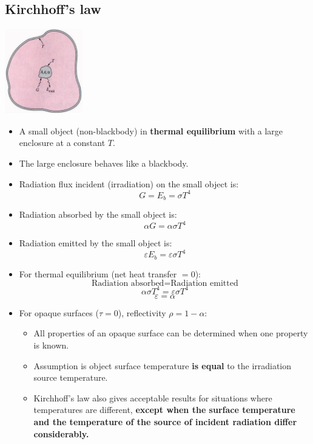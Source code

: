 \documentclass[11pt]{article}
\begin{document}
\subsection{Kirchhoff's law}
\label{sec:org850ffcd}
\begin{center}
\includegraphics[height=10em]{./images/kirchhoffs-law-diagram.png}
\end{center}
\begin{itemize}
\item A small object (non-blackbody) in \textbf{thermal equilibrium} with a large enclosure at a constant \(T\).
\item The large enclosure behaves like a blackbody.
\item Radiation flux incident (irradiation) on the small object is:
\[G = E_b = \sigma T^4\]
\item Radiation absorbed by the small object is:
\[\alpha G = \alpha \sigma T^4\]
\item Radiation emitted by the small object is:
\[\varepsilon E_b = \varepsilon \sigma T^4\]
\item For thermal equilibrium (net heat transfer \(= 0\)):
\[\text{Radiation absorbed} = \text{Radiation emitted}\]
\[\alpha \sigma T^4 = \varepsilon \sigma T^4\]
\[\varepsilon = \alpha\]
\item For opaque surfaces (\(\tau = 0\)), reflectivity \(\rho = 1 - \alpha\):
\begin{itemize}
\item All properties of an opaque surface can be determined when one property is known.
\item Assumption is object surface temperature \textbf{is equal} to the irradiation source temperature.
\item Kirchhoff's law also gives acceptable results for situations where temperatures are different, \textbf{except when the surface temperature and the temperature of the source of incident radiation differ considerably.}
\end{itemize}
\end{itemize}
\end{document}
